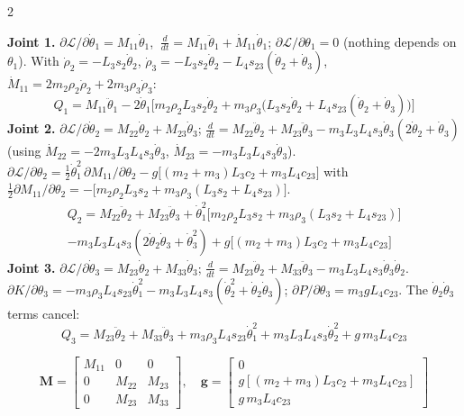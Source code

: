 \begin{multicols}{2}
\begin{examq}
\end{examq}
\begin{examq}
\textbf{Joint 1.} $\partial\mathcal L/\partial\dot\theta_1=M_{11}\dot\theta_1$, $\ \frac d{dt}=M_{11}\ddot\theta_1+\dot M_{11}\dot\theta_1$; $\partial\mathcal L/\partial\theta_1=0$ (nothing depends on $\theta_1$). With $\dot\rho_2=-L_3s_2\dot\theta_2$, $\dot\rho_3=-L_3s_2\dot\theta_2-L_4s_{23}(\dot\theta_2+\dot\theta_3)$, $\dot M_{11}=2m_2\rho_2\dot\rho_2+2m_3\rho_3\dot\rho_3$:
\[Q_1=M_{11}\ddot\theta_1-2\dot\theta_1\Big[m_2\rho_2L_3s_2\dot\theta_2+m_3\rho_3\big(L_3s_2\dot\theta_2+L_4s_{23}(\dot\theta_2+\dot\theta_3)\big)\Big]\]
\textbf{Joint 2.} $\partial\mathcal L/\partial\dot\theta_2=M_{22}\dot\theta_2+M_{23}\dot\theta_3$; $\frac d{dt}=M_{22}\ddot\theta_2+M_{23}\ddot\theta_3-m_3L_3L_4s_3\dot\theta_3(2\dot\theta_2+\dot\theta_3)$ (using $\dot M_{22}=-2m_3L_3L_4s_3\dot\theta_3$, $\dot M_{23}=-m_3L_3L_4s_3\dot\theta_3$). $\partial\mathcal L/\partial\theta_2=\tfrac12\dot\theta_1^2\,\partial M_{11}/\partial\theta_2-g\big[(m_2+m_3)L_3c_2+m_3L_4c_{23}\big]$ with $\tfrac12\partial M_{11}/\partial\theta_2=-\big[m_2\rho_2L_3s_2+m_3\rho_3(L_3s_2+L_4s_{23})\big]$.
\begin{multline*}Q_2=M_{22}\ddot\theta_2+M_{23}\ddot\theta_3+\dot\theta_1^2\big[m_2\rho_2L_3s_2+m_3\rho_3(L_3s_2+L_4s_{23})\big]\\-m_3L_3L_4s_3(2\dot\theta_2\dot\theta_3+\dot\theta_3^2)+g\big[(m_2+m_3)L_3c_2+m_3L_4c_{23}\big]\end{multline*}
\textbf{Joint 3.} $\partial\mathcal L/\partial\dot\theta_3=M_{23}\dot\theta_2+M_{33}\dot\theta_3$; $\frac d{dt}=M_{23}\ddot\theta_2+M_{33}\ddot\theta_3-m_3L_3L_4s_3\dot\theta_3\dot\theta_2$. $\partial K/\partial\theta_3=-m_3\rho_3L_4s_{23}\dot\theta_1^2-m_3L_3L_4s_3(\dot\theta_2^2+\dot\theta_2\dot\theta_3)$; $\partial P/\partial\theta_3=m_3gL_4c_{23}$. The $\dot\theta_2\dot\theta_3$ terms cancel:
\[Q_3=M_{23}\ddot\theta_2+M_{33}\ddot\theta_3+m_3\rho_3L_4s_{23}\dot\theta_1^2+m_3L_3L_4s_3\dot\theta_2^2+g\,m_3L_4c_{23}\]
\end{examq}
\begin{examq}
\[\mathbf M=\begin{bmatrix}M_{11}&0&0\\0&M_{22}&M_{23}\\0&M_{23}&M_{33}\end{bmatrix},\quad
\mathbf g=\begin{bmatrix}0\\g[(m_2+m_3)L_3c_2+m_3L_4c_{23}]\\g\,m_3L_4c_{23}\end{bmatrix}\]

\end{examq}
\end{multicols}
